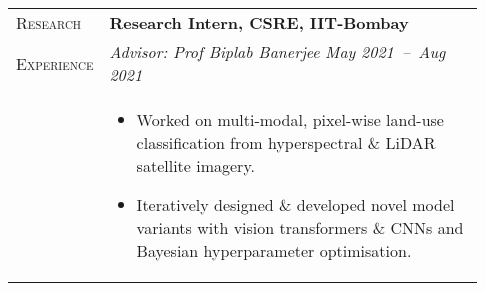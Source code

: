 \documentclass[letterpaper, 10pt, oneside]{article}
\newcommand{\stitle}[1]{\normalsize{\textsc{#1}}}
\newcommand{\bdit}[1]{{\textbf{#1}}}
\begin{document}
\begin{longtable}{@{} p{0.13\linewidth} p{0.8\linewidth}}
    \stitle{Research}    & \bdit{Research Intern, CSRE, IIT-Bombay}                                                                                                                                                                          \\
    \stitle{Experience}  & \textsl{Advisor: Prof Biplab Banerjee} \hfill \textsl{May 2021\ --\ Aug 2021}                                                                                                                                     \\
                         & \parbox{0.8\textwidth}{                                                                                                                                                                                           %
        \begin{itemize}[leftmargin=*, itemsep=-0.88ex, topsep=-0.88ex]
            \item Worked on multi-modal, pixel-wise land-use classification from hyperspectral \& LiDAR satellite imagery.
            \item Iteratively designed \& developed novel model variants with vision transformers \& CNNs and Bayesian hyperparameter optimisation.
        \end{itemize}
    }
    \\
    \\


\end{longtable}
\end{document}
